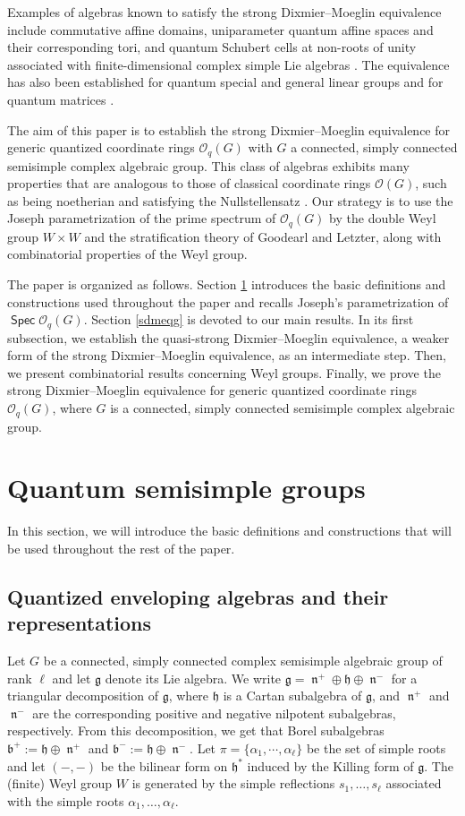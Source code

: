 \documentclass[11pt]{article}
\theoremstyle{definition}
\numberwithin{equation}{section}
\newcommand{\qu}{\mathcal{O}}
\DeclareMathOperator{\n}{\mathfrak{n}}
\newcommand\g{\mathfrak{g}}
\newcommand\bor{\mathfrak{b}}
\newcommand\h{\mathfrak{h}}
\DeclareMathOperator{\spec}{\mathsf{Spec}}
\begin{document}
Examples of algebras known to satisfy the strong Dixmier--Moeglin equivalence include commutative affine domains, uniparameter quantum affine spaces and their corresponding tori, and quantum Schubert cells at non-roots of unity associated with finite-dimensional complex simple Lie algebras \cite{BLN17}. The equivalence has also been established for quantum special and general linear groups and for quantum matrices \cite[$\S$3.8]{NO17}.

The aim of this paper is to establish the strong Dixmier--Moeglin equivalence for generic quantized coordinate rings $\qu_q(G)$ with $G$ a connected, simply connected semisimple complex algebraic group. This class of algebras exhibits many properties that are analogous to those of classical coordinate rings $\qu(G)$, such as being noetherian \cite[Theorem I.8.18]{BG02} and satisfying the Nullstellensatz \cite[Corollary II.7.20]{BG02}. Our strategy is to use the Joseph parametrization of the prime spectrum of $\qu_q(G)$ by the double Weyl group $W\times W$ and the stratification theory of Goodearl and Letzter, along with combinatorial properties of the Weyl group. 

The paper is organized as follows. Section \ref{qsemisimpleg} introduces the basic definitions and constructions used throughout the paper and recalls Joseph's parametrization of $\spec \qu_q(G)$. Section \ref{sdmeqg} is devoted to our main results. In its first subsection, we establish the quasi-strong Dixmier--Moeglin equivalence, a weaker form of the strong Dixmier--Moeglin equivalence, as an intermediate step. Then, we present combinatorial results concerning Weyl groups. Finally, we prove the strong Dixmier--Moeglin equivalence for generic quantized coordinate rings $\qu_q(G)$, where $G$ is a connected, simply connected semisimple complex algebraic group.



\section{Quantum semisimple groups}\label{qsemisimpleg}
In this section, we will introduce the basic definitions and constructions that will be used throughout the rest of the paper. 

\subsection{Quantized enveloping algebras and their representations}
Let $G$ be a connected, simply connected complex semisimple algebraic group of rank $\ell$ and let $\g$ denote its Lie algebra. We write $\g= \n^{+}\oplus\h\oplus\n^{-}$ for a triangular decomposition of $\g$, where $\h$ is a Cartan subalgebra of $\g$, and $\n^{+}$ and $\n^{-}$ are the corresponding positive and negative nilpotent subalgebras, respectively. From this decomposition, we get that Borel subalgebras $\bor^{+}:= \h\oplus\n^{+}$ and $\bor^{-}:= \h\oplus\n^{-}$. Let $\pi=\{\alpha_1,\cdots,\alpha_\ell\}$ be the set of simple roots  and let $(-, -)$ be the bilinear form on $\h^\ast$ induced by the Killing form of $\g$. The (finite) Weyl group $W$ is generated by the simple reflections $s_1,\dots,s_\ell$ associated with the simple roots $\alpha_1,\dots,\alpha_\ell$.
 
\end{document}
